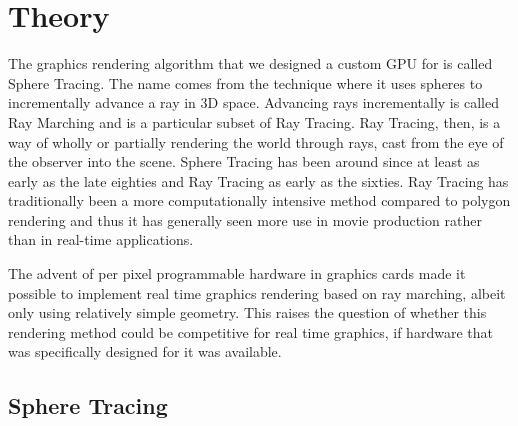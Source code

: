 \chapter{Theory}


	The graphics rendering algorithm that we designed a custom GPU for is called
	Sphere Tracing\cite{Hart1996}. The name comes from the technique where it 
	uses spheres to incrementally advance a ray in 3D space. Advancing rays 
	incrementally is called Ray Marching and is a particular subset of Ray
	Tracing.\cite{Whitted1980} Ray Tracing, then, is a way of wholly or
	partially rendering the world through rays, cast from the eye of the
	observer into the scene. Sphere Tracing has been around since at least as
	early as the late eighties and Ray Tracing as early as the
	sixties\cite{Hart1989,Appel1968}. Ray Tracing has traditionally been a 
	more computationally intensive method compared to polygon
	rendering\cite{Wylie1967} and thus it has generally seen more use in movie  
	production rather than in real-time applications.\cite{ref_needed?} 
	
	The advent of per pixel programmable hardware in graphics cards made it 
	possible to implement real time graphics rendering based on ray	marching, 
	albeit only using relatively simple geometry. This raises the question of 
	whether this rendering method could be competitive for real time graphics, 
	if hardware that was specifically designed for it was available.
	
		
	\section{Sphere Tracing} 

